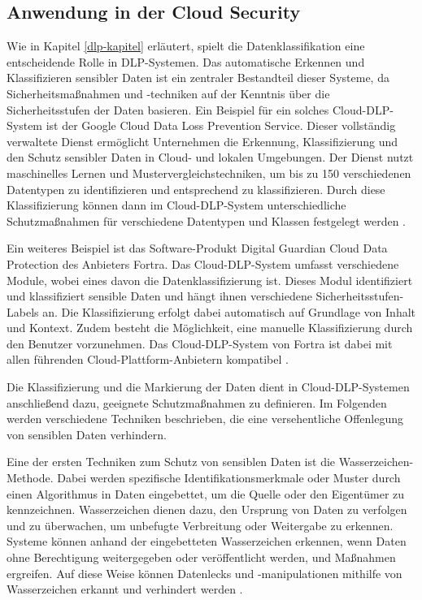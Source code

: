 \subsection{Anwendung in der Cloud Security}
Wie in Kapitel \ref{dlp-kapitel} erläutert, spielt die Datenklassifikation eine entscheidende Rolle in DLP-Systemen. Das automatische Erkennen und Klassifizieren sensibler Daten ist ein zentraler Bestandteil dieser Systeme, da Sicherheitsmaßnahmen und -techniken auf der Kenntnis über die Sicherheitsstufen der Daten basieren.
Ein Beispiel für ein solches Cloud-DLP-System ist der Google Cloud Data Loss Prevention Service. Dieser vollständig verwaltete Dienst ermöglicht Unternehmen die Erkennung, Klassifizierung und den Schutz sensibler Daten in Cloud- und lokalen Umgebungen. Der Dienst nutzt maschinelles Lernen und Mustervergleichstechniken, um bis zu 150 verschiedenen Datentypen zu identifizieren und entsprechend zu klassifizieren. Durch diese Klassifizierung können dann im Cloud-DLP-System unterschiedliche Schutzmaßnahmen für verschiedene Datentypen und Klassen festgelegt werden \cite{GoogleCloud.30.11.2023}.

Ein weiteres Beispiel ist das Software-Produkt Digital Guardian Cloud Data Protection des Anbieters Fortra. Das Cloud-DLP-System umfasst verschiedene Module, wobei eines davon die Datenklassifizierung ist. Dieses Modul identifiziert und klassifiziert sensible Daten und hängt ihnen verschiedene Sicherheitsstufen-Labels an. Die Klassifizierung erfolgt dabei automatisch auf Grundlage von Inhalt und Kontext. Zudem besteht die Möglichkeit, eine manuelle Klassifizierung durch den Benutzer vorzunehmen. Das Cloud-DLP-System von Fortra ist dabei mit allen führenden Cloud-Plattform-Anbietern kompatibel \cite{DigitalGuardian.30.11.2023}.

Die Klassifizierung und die Markierung der Daten dient in Cloud-DLP-Systemen anschließend dazu, geeignete Schutzmaßnahmen zu definieren. Im Folgenden werden verschiedene Techniken beschrieben, die eine versehentliche Offenlegung von sensiblen Daten verhindern.

Eine der ersten Techniken zum Schutz von sensiblen Daten ist die Wasserzeichen-Methode. Dabei werden spezifische Identifikationsmerkmale oder Muster durch einen Algorithmus in Daten eingebettet, um die Quelle oder den Eigentümer zu kennzeichnen. Wasserzeichen dienen dazu, den Ursprung von Daten zu verfolgen und zu überwachen, um unbefugte Verbreitung oder Weitergabe zu erkennen. Systeme können anhand der eingebetteten Wasserzeichen erkennen, wenn Daten ohne Berechtigung weitergegeben oder veröffentlicht werden, und Maßnahmen ergreifen. Auf diese Weise können Datenlecks und -manipulationen mithilfe von Wasserzeichen erkannt und verhindert werden \cite{Naik.2019}.

